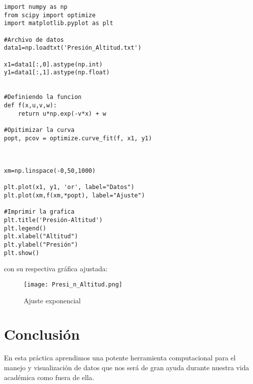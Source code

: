 \documentclass[a4 paper]{article}
\numberwithin{equation}{section}
\newcommand{\0}{\mathbf{0}}
\begin{document}
\begin{verbatim}
import numpy as np
from scipy import optimize
import matplotlib.pyplot as plt

#Archivo de datos
data1=np.loadtxt('Presión_Altitud.txt')

x1=data1[:,0].astype(np.int)
y1=data1[:,1].astype(np.float)


#Definiendo la funcion
def f(x,u,v,w):
    return u*np.exp(-v*x) + w
    
#Opitimizar la curva    
popt, pcov = optimize.curve_fit(f, x1, y1)


    
xm=np.linspace(-0,50,1000)

plt.plot(x1, y1, 'or', label="Datos")
plt.plot(xm,f(xm,*popt), label="Ajuste")

#Imprimir la grafica
plt.title('Presión-Altitud')
plt.legend()
plt.xlabel("Altitud")
plt.ylabel("Presión")
plt.show()
\end{verbatim}

\newpage
con su respectiva gr\'afica ajustada:

\begin{figure}[!ht]
  \centering
      \texttt{[image: Presi\_n\_Altitud.png]}
  \caption{Ajuste exponencial}
\end{figure}

\section*{Conclusi\'on}

En esta pr\'actica aprendimos una potente herramienta computacional para el manejo y visualización de datos que nos ser\'a de gran ayuda durante nuestra vida académica como fuera de ella.
\end{document}
